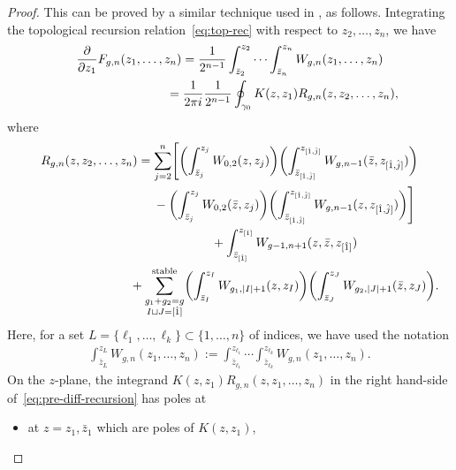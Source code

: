 \documentclass[pdftex]{sigma}
\theoremstyle{definition}
\numberwithin{equation}{section}
\def\p{\partial}
\begin{document}
\begin{proof}
This can be proved by a similar technique used in
\cite[Theorem~4.7]{DM14}, as follows. Integrating
the topological recursion relation~\eqref{eq:top-rec}
with respect to $z_{2}, \dots, z_{n}$, we have
\begin{gather}
\frac{\p}{\p z_{1}} F_{g,n}(z_{1},\dots,z_{n})  =
\frac{1}{2^{n-1}}\int_{\bar{z}_{2}}^{z_{2}} \cdots
\int_{\bar{z}_{n}}^{z_{n}} W_{g,n}(z_{1},\dots,z_{n})\nonumber \\
\hphantom{\frac{\p}{\p z_{1}} F_{g,n}(z_{1},\dots,z_{n})}{}
=
\frac{1}{2\pi i} \frac{1}{2^{n-1}} \oint_{\gamma_{0}}
K(z,z_{1}) R_{g,n}(z,z_{2},\dots,z_{n}), \label{eq:pre-diff-recursion}
\end{gather}
where
\begin{gather*}
R_{g,n}(z,z_{2},\dots,z_{n}) =
\sum_{j=2}^{n}
\Biggl[ \biggl(\int^{z_{j}}_{\bar{z}_{j}}W_{0,2}(z,z_{j}) \biggr)
\biggl(\int^{z_{[\hat{1}, \hat{j}]}}_{\bar{z}_{[\hat{1}, \hat{j}]}}
W_{g,n-1}(\bar{z}, z_{[\hat{1},\hat{j}]}) \biggr)\\
\hphantom{R_{g,n}(z,z_{2},\dots,z_{n}) =}{}
- \biggl(\int^{z_{j}}_{\bar{z}_{j}}W_{0,2}(\bar{z},z_{j}) \biggr)
\biggl(\int^{z_{[\hat{1}, \hat{j}]}}_{\bar{z}_{[\hat{1}, \hat{j}]}}
W_{g,n-1}(z, z_{[\hat{1},\hat{j}]})
\biggr) \Biggr]
\\
\hphantom{R_{g,n}(z,z_{2},\dots,z_{n}) =}{}
+ \int^{z_{[\hat{1}]}}_{\bar{z}_{[\hat{1}]}}
W_{g-1,n+1}(z,\bar{z},z_{[\hat{1}]})\\
\hphantom{R_{g,n}(z,z_{2},\dots,z_{n}) =}{}
 + \sum_{\substack{g_{1}+g_{2}=g \\
 I \sqcup J = [\hat{1}]}}^{\text{stable}}
\biggl( \int^{z_{I}}_{\bar{z}_{I}}
W_{g_{1}, |I|+1}(z,z_{I}) \biggr)
\biggl( \int^{z_{J}}_{\bar{z}_{J}}
W_{g_{2}, |J|+1}(\bar{z}, z_{J})
\biggr).
\end{gather*}
Here, for a set $L =\{\ell_{1}, \dots, \ell_{k} \}
\subset \{1,\dots,n \}$ of indices, we have used the notation
\begin{gather*}
\int^{z_{L}}_{\bar{z}_{L}} W_{g,n}(z_{1},\dots,z_{n}) :=
\int^{z_{\ell_{1}}}_{\bar{z}_{\ell_{1}}} \cdots
\int^{z_{\ell_{k}}}_{\bar{z}_{\ell_{k}}} W_{g,n}(z_{1},\dots,z_{n}).
\end{gather*}
On the $z$-plane, the integrand
$K(z,z_{1})R_{g,n}(z,z_{1},\dots,z_{n})$
in the right hand-side of~\eqref{eq:pre-diff-recursion}
has poles at
\begin{itemize}\itemsep=0pt
\item
at $z = z_{1}, \bar{z}_{1}$ which are poles of $K(z,z_{1})$,

\end{itemize}
\end{proof}
\end{document}
